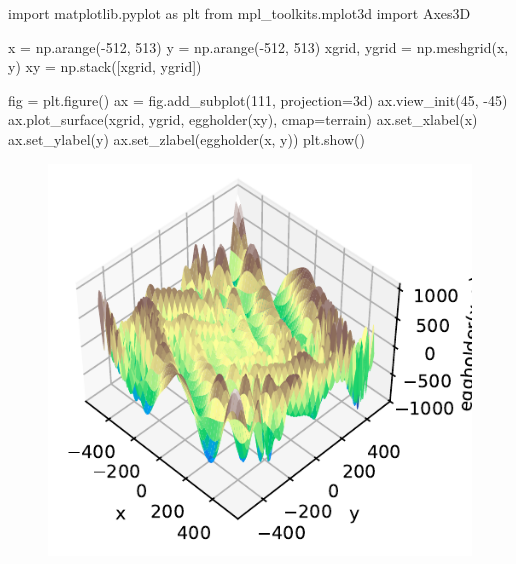 \documentclass[
  letterpaper,
  DIV=11,
  numbers=noendperiod]{scrreprt}
\newenvironment{Shaded}{\begin{snugshade}}{\end{snugshade}}
\newcommand{\DecValTok}[1]{\textcolor[rgb]{0.68,0.00,0.00}{#1}}
\newcommand{\ImportTok}[1]{\textcolor[rgb]{0.00,0.46,0.62}{#1}}
\newcommand{\NormalTok}[1]{\textcolor[rgb]{0.00,0.23,0.31}{#1}}
\newcommand{\OperatorTok}[1]{\textcolor[rgb]{0.37,0.37,0.37}{#1}}
\newcommand{\StringTok}[1]{\textcolor[rgb]{0.13,0.47,0.30}{#1}}
\begin{document}
\begin{Shaded}
\begin{Highlighting}[]
\ImportTok{import}\NormalTok{ matplotlib.pyplot }\ImportTok{as}\NormalTok{ plt}
\ImportTok{from}\NormalTok{ mpl\_toolkits.mplot3d }\ImportTok{import}\NormalTok{ Axes3D}

\NormalTok{x }\OperatorTok{=}\NormalTok{ np.arange(}\OperatorTok{{-}}\DecValTok{512}\NormalTok{, }\DecValTok{513}\NormalTok{)}
\NormalTok{y }\OperatorTok{=}\NormalTok{ np.arange(}\OperatorTok{{-}}\DecValTok{512}\NormalTok{, }\DecValTok{513}\NormalTok{)}
\NormalTok{xgrid, ygrid }\OperatorTok{=}\NormalTok{ np.meshgrid(x, y)}
\NormalTok{xy }\OperatorTok{=}\NormalTok{ np.stack([xgrid, ygrid])}

\NormalTok{fig }\OperatorTok{=}\NormalTok{ plt.figure()}
\NormalTok{ax }\OperatorTok{=}\NormalTok{ fig.add\_subplot(}\DecValTok{111}\NormalTok{, projection}\OperatorTok{=}\StringTok{\textquotesingle{}3d\textquotesingle{}}\NormalTok{)}
\NormalTok{ax.view\_init(}\DecValTok{45}\NormalTok{, }\OperatorTok{{-}}\DecValTok{45}\NormalTok{)}
\NormalTok{ax.plot\_surface(xgrid, ygrid, eggholder(xy), cmap}\OperatorTok{=}\StringTok{\textquotesingle{}terrain\textquotesingle{}}\NormalTok{)}
\NormalTok{ax.set\_xlabel(}\StringTok{\textquotesingle{}x\textquotesingle{}}\NormalTok{)}
\NormalTok{ax.set\_ylabel(}\StringTok{\textquotesingle{}y\textquotesingle{}}\NormalTok{)}
\NormalTok{ax.set\_zlabel(}\StringTok{\textquotesingle{}eggholder(x, y)\textquotesingle{}}\NormalTok{)}
\NormalTok{plt.show()}
\end{Highlighting}
\end{Shaded}

\begin{figure}[H]

{\centering \includegraphics{003_scipy_optimize_intro_files/figure-pdf/cell-12-output-1.pdf}

}

\end{figure}
\end{document}
